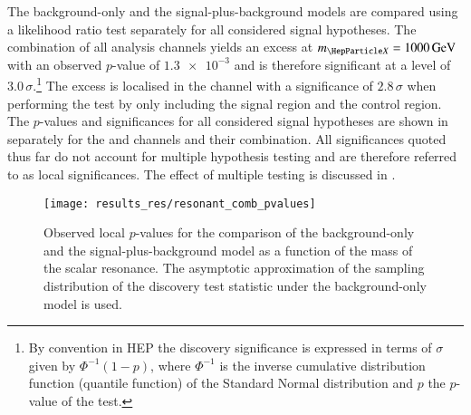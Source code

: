 %
The background-only and the signal-plus-background models are compared
using a likelihood ratio test separately for all considered signal
hypotheses. The combination of all analysis channels yields an excess
at $\mX = \SI{1000}{\GeV}$ with an observed $p$-value of
$\num{1.3e-3}$ and is therefore significant at a level of
$\num{3.0}\,\sigma$.\footnote{By convention in HEP the discovery
  significance is expressed in terms of $\sigma$ given by
  $\Phi^{-1}(1 - p)$, where $\Phi^{-1}$ is the inverse cumulative
  distribution function (quantile function) of the Standard Normal
  distribution and $p$ the $p$-value of the test.} The excess is
localised in the \hadhad channel with a significance of
$\num{2.8}\,\sigma$ when performing the test by only including the
\hadhad signal region and the \ZHF control region. The $p$-values and
significances for all considered signal hypotheses are shown in
 separately for the \lephad and \hadhad
channels and their combination. All significances quoted thus far do
not account for multiple hypothesis testing and are therefore referred
to as local significances. The effect of multiple testing is discussed
in .

\begin{figure}[htbp]
  \centering

  \texttt{[image: results\_res/resonant\_comb\_pvalues]}

  \caption{Observed local $p$-values for the comparison of the
    background-only and the signal-plus-background model as a function
    of the mass of the scalar resonance. The asymptotic approximation
    of the sampling distribution of the discovery test statistic under
    the background-only model is used.}%
  \label{fig:local_pvalues}

\end{figure}

